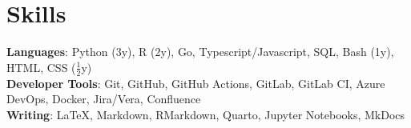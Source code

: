 \section{Skills}

\begin{itemize}[leftmargin=0.15in, label={}]
    \small{\item{
                    \textbf{Languages}{: Python (3y), R (2y), Go, Typescript/Javascript, SQL, Bash (1y), HTML, CSS ($\frac{1}{2}$y)} \\
                    \textbf{Developer Tools}{: Git, GitHub, GitHub Actions, GitLab, GitLab CI, Azure DevOps, Docker, Jira/Vera, Confluence} \\
                    \textbf{Writing}{: LaTeX, Markdown, RMarkdown, Quarto, Jupyter Notebooks, MkDocs}
              }}
\end{itemize}
